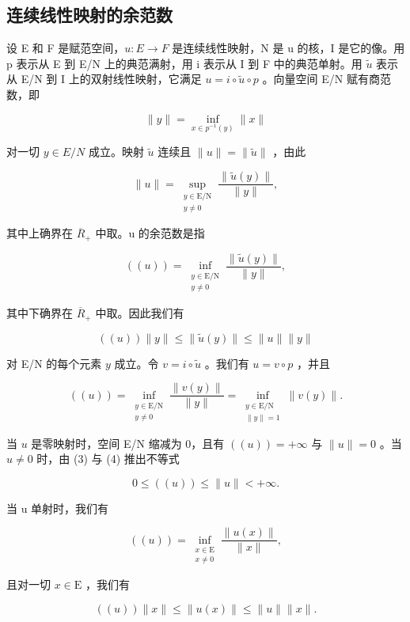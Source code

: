 \subsection{连续线性映射的余范数}

设 E 和 F 是赋范空间，\(u: E \rightarrow F\) 是连续线性映射，N 是 u 的核，I 是它的像。用 p 表示从 E 到 E/N 上的典范满射，用 i 表示从 I 到 F 中的典范单射。用 \(\widetilde{u}\) 表示从 E/N 到 I 上的双射线性映射，它满足 \(u = i \circ \widetilde{u} \circ p\) 。向量空间 E/N 赋有商范数，即

\[
\| y \| = \inf _ {x \in p^{-1}(y)} \| x \|\tag{2}
\]

对一切 \(y \in E/N\) 成立。映射 \(\widetilde{u}\) 连续且 \(\|u\| = \|\widetilde{u}\|\) ，由此

\[
\| u\| = \sup_{\substack{y\in \mathrm{E / N}\\ y\neq 0}}\frac{\|\widetilde{u} (y)\|}{\|y\|},\tag{3}
\]

其中上确界在 \(\overline{R}_{+}\) 中取。u 的余范数是指

\[
((u)) = \inf_{\substack{y\in \mathrm{E} / \mathrm{N}\\ y\neq 0}}\frac{\| \widetilde{u}(y)\|}{\|y\|},\tag{4}
\]

其中下确界在 \(\overline{R}_{+}\) 中取。因此我们有

\[
((u)) \| y \| \leqslant \| \widetilde {u} (y) \| \leqslant \| u \| \| y \|\tag{5}
\]

对 E/N 的每个元素 \(y\) 成立。令 \(v = i \circ \widetilde{u}\) 。我们有 \(u = v \circ p\) ，并且

\[
((u)) = \inf_{\substack{y\in \mathrm{E / N}\\ y\neq 0}}\frac{\|v(y)\|}{\|y\|} = \inf_{\substack{y\in \mathrm{E / N}\\ \|y\| = 1}}\| v(y)\| .\tag{6}
\]

当 \(u\) 是零映射时，空间 E/N 缩减为 0，且有 \(((u)) = +\infty\) 与 \(\| u \| = 0\) 。当 \(u \neq 0\) 时，由 (3) 与 (4) 推出不等式

\[
0 \leqslant ((u)) \leqslant \| u \| <   + \infty .\tag{7}
\]

当 u 单射时，我们有

\[
((u)) = \inf_{\substack{x\in \mathrm{E}\\ x\neq 0}}\frac{\|u(x)\|}{\|x\|},\tag{8}
\]

且对一切 \(x \in \mathrm{E}\) ，我们有

\[
((u)) \| x \| \leqslant \| u (x) \| \leqslant \| u \| \| x \|.\tag{9}
\]

